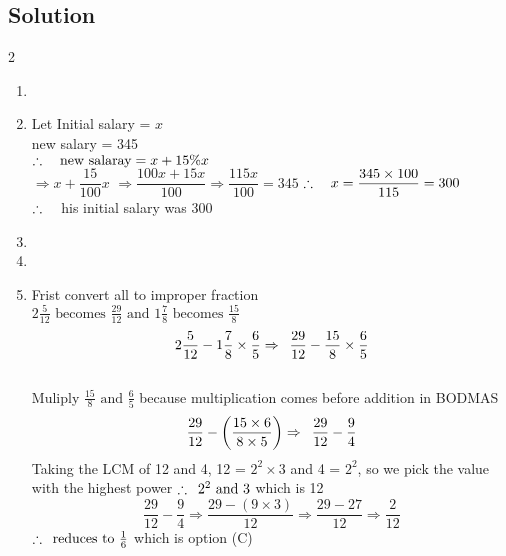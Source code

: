 \subsection{Solution}
\begin {multicols}{2}
\begin{enumerate}[label={\arabic*.}]
    \item 
    \item Let Initial salary = \(x\)\\ new salary = 345 \\
    \(\therefore \hspace{10px} \text{new salaray} = x + 15\%x\)\\
    \(\Rightarrow  x +\dfrac{15}{100}x\)
    \(\Rightarrow \dfrac{100x + 15x}{100} \Rightarrow \dfrac{115x}{100} = 345\)
    \(\therefore \hspace{10px} x = \dfrac{345 \times 100}{115} = 300\)\\
    \(\therefore \hspace{10px}\) his initial salary was 300
    \item 
    \item
    \item Frist convert all to improper fraction\\ 
    \(2\frac{5}{12} \text{ becomes } \frac{29}{12} \text{ and } 1\frac{7}{8} \text{ becomes } \frac{15}{8}\) \\
    \[2\frac{5}{12} - 1\frac{7}{8} \times \frac{6}{5} \Rightarrow \hspace{5px} \frac{29}{12} - \frac{15}{8} \times \frac{6}{5}\] \\
    Muliply \(\frac{15}{8} \text{ and } \frac{6}{5} \) because multiplication comes before addition in BODMAS
    \[ \frac{29}{12} - \left(\frac{15 \times 6}{8 \times 5}\right) \Rightarrow \hspace{5px} \frac{29}{12} - \frac{9}{4}\] 
    Taking the LCM of 12 and 4, 12 = \(2^2 \times 3\) and 4 = \(2^2\), so we pick the value with the highest power \(\therefore \hspace{5px} 2^2 \text{ and } 3 \) which is 12\\
    \[\frac{29}{12} - \frac{9}{4} \Rightarrow \frac{29 - (9 \times 3)  }{12} \Rightarrow \frac{29 - 27}{12} \Rightarrow \frac{2}{12}\] 
    \(\therefore \hspace{5px} \text{reduces to }\frac{1}{6} \) which is option (C)


\end{enumerate}
\end{multicols}
